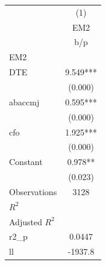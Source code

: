 {
\def\sym#1{\ifmmode^{#1}\else\(^{#1}\)\fi}
\begin{tabular}{l*{1}{c}}
\hline\hline
                    &\multicolumn{1}{c}{(1)}\\
                    &\multicolumn{1}{c}{EM2}\\
                    &         b/p   \\
\hline
EM2                 &               \\
DTE                 &       9.549***\\
                    &     (0.000)   \\
abaccmj             &       0.595***\\
                    &     (0.000)   \\
cfo                 &       1.925***\\
                    &     (0.000)   \\
Constant            &       0.978** \\
                    &     (0.023)   \\
\hline
Observations        &        3128   \\
\(R^{2}\)           &               \\
Adjusted \(R^{2}\)  &               \\
r2\_p                &      0.0447   \\
ll                  &     -1937.8   \\
\hline\hline
\end{tabular}
}
